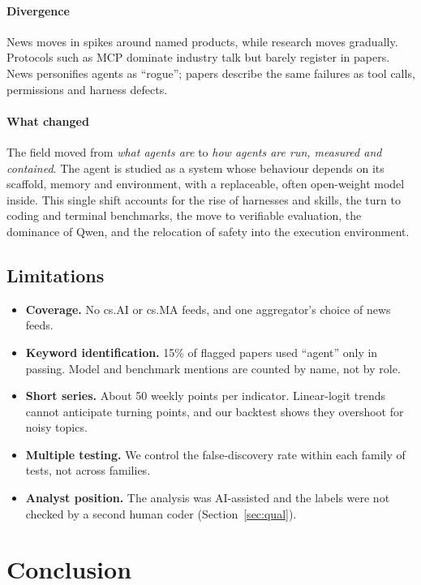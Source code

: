 \documentclass[10.5pt]{article}
\begin{document}
\paragraph{Divergence} News moves in spikes around named products, while research moves gradually. Protocols such as MCP dominate industry talk but barely register in papers. News personifies agents as \enquote{rogue}; papers describe the same failures as tool calls, permissions and harness defects.

\paragraph{What changed} The field moved from \emph{what agents are} to \emph{how agents are run, measured and contained}. The agent is studied as a system whose behaviour depends on its scaffold, memory and environment, with a replaceable, often open-weight model inside. This single shift accounts for the rise of harnesses and skills, the turn to coding and terminal benchmarks, the move to verifiable evaluation, the dominance of Qwen, and the relocation of safety into the execution environment.

\subsection{Limitations}
\begin{itemize}
  \item \textbf{Coverage.} No cs.AI or cs.MA feeds, and one aggregator's choice of news feeds.
  \item \textbf{Keyword identification.} 15\% of flagged papers used \enquote{agent} only in passing. Model and benchmark mentions are counted by name, not by role.
  \item \textbf{Short series.} About 50 weekly points per indicator. Linear-logit trends cannot anticipate turning points, and our backtest shows they overshoot for noisy topics.
  \item \textbf{Multiple testing.} We control the false-discovery rate within each family of tests, not across families.
  \item \textbf{Analyst position.} The analysis was AI-assisted and the labels were not checked by a second human coder (Section~\ref{sec:qual}).
\end{itemize}

\section{Conclusion}
\end{document}
